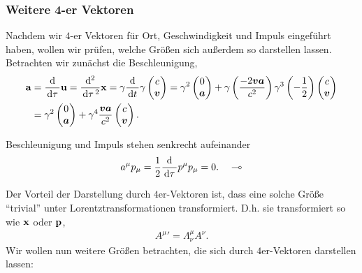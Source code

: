 \subsubsection{Weitere 4-er Vektoren}

Nachdem wir $4$-er Vektoren für Ort, Geschwindigkeit und Impuls eingeführt
haben, wollen wir prüfen, welche Größen sich außerdem so darstellen lassen.
Betrachten wir zunächst die Beschleunigung,
\begin{align*}
\bm{\mathrm{a}} &= \frac{\mathrm{d}}{\,\mathrm{d} \tau\,}\bm{\mathrm{u}} = \frac{\mathrm{d}^2}{\,\mathrm{d} \tau\,^2}\bm{\mathrm{x}} =
\gamma\frac{\mathrm{d}}{\,\mathrm{d} t\,}\gamma\begin{pmatrix}c\\ \bm{v}\end{pmatrix}
= \gamma^2 \begin{pmatrix}0\\ \bm{a}\end{pmatrix} +
\gamma\left(\frac{-2\bm{v}\bm{a}}{c^2}\right)\gamma^3\left(-\frac{1}{2}\right)
\begin{pmatrix}c \\ \bm{v}\end{pmatrix}\\
&= \gamma^2 \begin{pmatrix}0\\\bm{a}\end{pmatrix} + \gamma^4
\frac{\bm{v}\bm{a}}{c^2}\begin{pmatrix}c\\\bm{v}\end{pmatrix}.
\end{align*}
\begin{bemn}
Beschleunigung und Impuls stehen senkrecht aufeinander
\begin{align*}
a^\mu p_\mu =
\frac{1}{2}\frac{\mathrm{d}}{\,\mathrm{d} \tau\,}p^\mu p_\mu = 0.\quad\multimap
\end{align*}
\end{bemn}
Der Vorteil der Darstellung durch $4$er-Vektoren ist, dass eine solche Größe
``trivial'' unter Lorentztransformationen transformiert. D.h. sie transformiert
so wie $\bm{\mathrm{x}}$ oder $\bm{\mathrm{p}}$,
\begin{align*}
{A^\mu}' = \Lambda_\nu^\mu A^\nu.
\end{align*}
Wir wollen nun weitere Größen betrachten, die sich durch $4$er-Vektoren
darstellen lassen:
